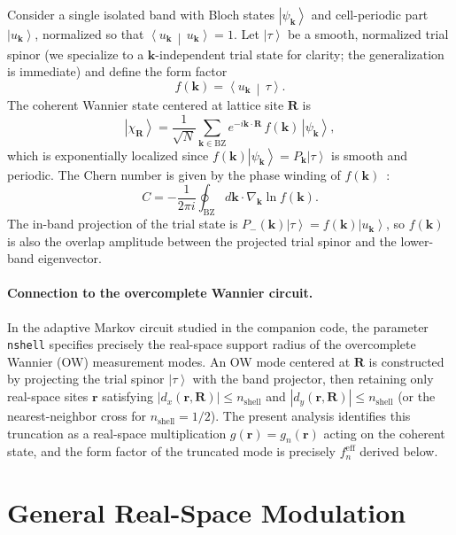 \documentclass[aps,prb,onecolumn,nofootinbib,superscriptaddress]{revtex4-2}
\newcommand{\mbf}[1]{\mathbf{#1}}
\newcommand{\ket}[1]{\left|#1\right\rangle}
\newcommand{\braket}[2]{\left\langle#1\,\middle|\,#2\right\rangle}
\begin{document}
Consider a single isolated band with Bloch states $\ket{\psi_{\mbf{k}}}$ and cell-periodic part $\ket{u_{\mbf{k}}}$, normalized so that $\braket{u_{\mbf{k}}}{u_{\mbf{k}}} = 1$. Let $\ket{\tau}$ be a smooth, normalized trial spinor (we specialize to a $\mbf{k}$-independent trial state for clarity; the generalization is immediate) and define the form factor
\begin{equation}
f(\mbf{k}) = \braket{u_{\mbf{k}}}{\tau}.
\end{equation}
The coherent Wannier state centered at lattice site $\mbf{R}$ is
\begin{equation}\label{eq:coherent}
\ket{\chi_{\mbf{R}}} = \frac{1}{\sqrt{N}} \sum_{\mbf{k} \in \mathrm{BZ}} e^{-i\mbf{k}\cdot\mbf{R}}\, f(\mbf{k})\, \ket{\psi_{\mbf{k}}},
\end{equation}
which is exponentially localized since $f(\mbf{k})\ket{\psi_{\mbf{k}}} = P_{\mbf{k}}\ket{\tau}$ is smooth and periodic. The Chern number is given by the phase winding of $f(\mbf{k})$~\cite{Li2024}:
\begin{equation}\label{eq:chern_winding}
C = -\frac{1}{2\pi i} \oint_{\mathrm{BZ}} d\mbf{k} \cdot \nabla_{\mbf{k}} \ln f(\mbf{k}).
\end{equation}
The in-band projection of the trial state is $P_-(\mbf{k})\ket{\tau} = f(\mbf{k})\ket{u_{\mbf{k}}}$, so $f(\mbf{k})$ is also the overlap amplitude between the projected trial spinor and the lower-band eigenvector.

\paragraph*{Connection to the overcomplete Wannier circuit.} In the adaptive Markov circuit studied in the companion code, the parameter \texttt{nshell} specifies precisely the real-space support radius of the overcomplete Wannier (OW) measurement modes. An OW mode centered at $\mbf{R}$ is constructed by projecting the trial spinor $\ket{\tau}$ with the band projector, then retaining only real-space sites $\mbf{r}$ satisfying $|d_x(\mbf{r},\mbf{R})|\leq n_{\mathrm{shell}}$ and $|d_y(\mbf{r},\mbf{R})|\leq n_{\mathrm{shell}}$ (or the nearest-neighbor cross for $n_{\mathrm{shell}}=1/2$). The present analysis identifies this truncation as a real-space multiplication $g(\mbf{r})=g_n(\mbf{r})$ acting on the coherent state, and the form factor of the truncated mode is precisely $f_n^{\mathrm{eff}}$ derived below.

\section{General Real-Space Modulation}
\label{sec:general}
\end{document}

